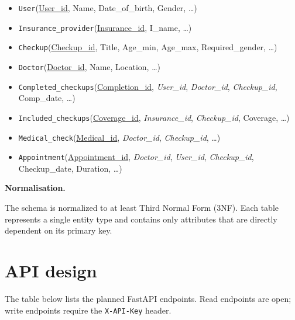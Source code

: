 \documentclass[11pt,a4paper]{article}
\begin{document}
\begin{itemize}
  \item \texttt{User}(\underline{User\_id}, Name, Date\_of\_birth, Gender, \dots)
  \item \texttt{Insurance\_provider}(\underline{Insurance\_id}, I\_name, \dots)
  \item \texttt{Checkup}(\underline{Checkup\_id}, Title, Age\_min, Age\_max, Required\_gender, \dots)
  \item \texttt{Doctor}(\underline{Doctor\_id}, Name, Location, \dots)
  \item \texttt{Completed\_checkups}(\underline{Completion\_id}, \emph{User\_id}, \emph{Doctor\_id}, \emph{Checkup\_id},  Comp\_date, \dots)
  \item \texttt{Included\_checkups}(\underline{Coverage\_id}, \emph{Insurance\_id}, \emph{Checkup\_id}, Coverage, \dots)
  \item \texttt{Medical\_check}(\underline{Medical\_id}, \emph{Doctor\_id}, \emph{Checkup\_id}, \dots)
  \item \texttt{Appointment}(\underline{Appointment\_id}, \emph{Doctor\_id}, \emph{User\_id},  \emph{Checkup\_id}, Checkup\_date, Duration, \dots)
\end{itemize}

\textbf{Normalisation.} 

The schema is normalized to at least Third Normal Form (3NF). 
Each table represents a single entity type and contains only attributes that are directly dependent on its primary key.


\section{API design}

The table below lists the planned FastAPI endpoints. Read endpoints are open;
write endpoints require the \texttt{X-API-Key} header.
\end{document}
